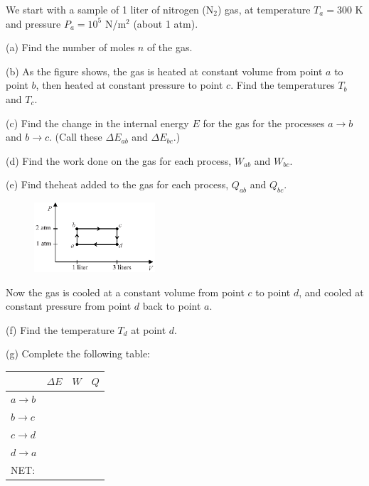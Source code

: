 We start with a sample of 1 liter of nitrogen ($\textrm{N}_2$) gas, at temperature $T_a = 300$ K and pressure $P_a = 10^5$ N/m$^2$ (about 1 atm).

(a) Find the number of moles $n$ of the gas.
\vspace{1.0in}

(b) As the figure shows, the gas is heated at constant volume from point $a$ to point $b$, then heated at constant pressure to point $c$.  Find the temperatures $T_b$ and $T_c$.  
\vspace{1.4in}

(c) Find the change in the internal energy $E$ for the gas for the processes $a \rightarrow b$ and $b \rightarrow c$.  (Call these $\Delta E_{ab}$ and $\Delta E_{bc}$.)
\vspace{1.5in}

\pagebreak
(d) Find the work done on the gas for each process, $W_{ab}$ and $W_{bc}$.  
\vspace{1.3in}

(e) Find theheat added to the gas for each process, $Q_{ab}$ and $Q_{bc}$.  
\vspace{1.3in}

\begin{figure}
  \vspace{-0.4 in}
  \includegraphics[width=0.4\textwidth]{ideal_gas_cycles/square_cycle2.eps}
\end{figure}

Now the gas is cooled at a constant volume from point $c$ to point $d$, and cooled at constant pressure from point $d$ back to point $a$.  

(f) Find the temperature $T_d$ at point $d$.
\vspace{0.9in}

(g) Complete the following table:


\vspace{0.1 in}
\renewcommand{\arraystretch}{2.0}
\begin{tabular}{| C{1in} |C{1in} | C{1in} | C{1in} |}
\hline
& $\Delta E$ & $W$ & $Q$ \\ \hline
$a \rightarrow b$ & & & \\ \hline
$b \rightarrow c$ & & & \\ \hline
$c \rightarrow d$ & & & \\ \hline
$d \rightarrow a$ & & & \\ \hline
\hline
NET: & & & \\ \hline
\end{tabular}
\renewcommand{\arraystretch}{1.0}


